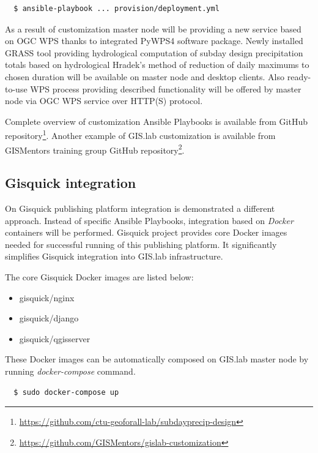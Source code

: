 \documentclass{isprs}
\begin{document}
\begin{lstlisting}
  $ ansible-playbook ... provision/deployment.yml
\end{lstlisting}

As a result of customization master node will be providing a new
service based on OGC WPS thanks to integrated PyWPS4 software
package. Newly installed GRASS tool providing hydrological computation
of subday design precipitation totals based on hydrological Hradek's
method of reduction of daily maximums to chosen duration will be
available on master node and desktop clients. Also ready-to-use WPS
process providing described functionality will be offered by master
node via OGC WPS service over HTTP(S) protocol.

Complete overview of customization Ansible Playbooks is available from
GitHub
repository\footnote{\url{https://github.com/ctu-geoforall-lab/subdayprecip-design}}. Another
example of GIS.lab customization is available from GISMentors training
group GitHub
repository\footnote{\url{https://github.com/GISMentors/gislab-customization}}.

\subsection{Gisquick integration}

On Gisquick publishing platform integration is demonstrated a
different approach. Instead of specific Ansible Playbooks, integration
based on \textit{Docker} containers will be performed. Gisquick
project provides core Docker images needed for successful running of
this publishing platform. It significantly simplifies Gisquick
integration into GIS.lab infrastructure.

The core Gisquick Docker images are listed below:

\begin{itemize}
\setlength\itemsep{0em}\setlength\parskip{0em}\setlength\topsep{0em}\setlength\partopsep{0em}\setlength\parsep{0em}
\item{gisquick/nginx}
\item{gisquick/django}
\item{gisquick/qgisserver}
\end{itemize}

These Docker images can be automatically composed on GIS.lab master
node by running \textit{docker-compose} command.

\begin{lstlisting}
  $ sudo docker-compose up
\end{lstlisting}
\end{document}
